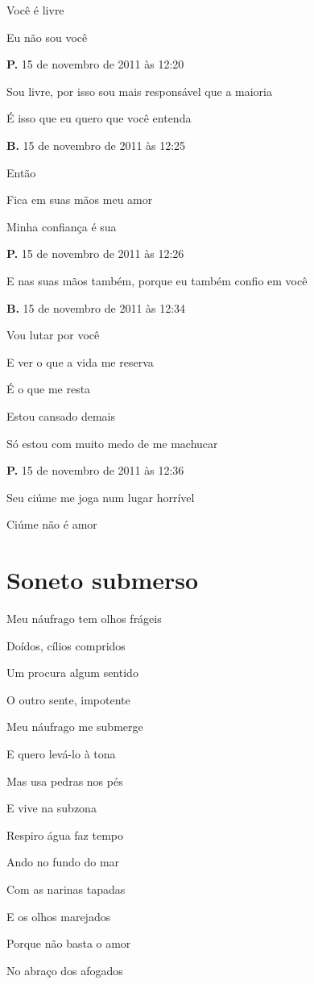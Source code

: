 {Você é livre

Eu não sou você

\textbf{P.} 15 de novembro de 2011 às 12:20

Sou livre, por isso sou mais responsável que a maioria

É isso que eu quero que você entenda

\textbf{B.} 15 de novembro de 2011 às 12:25

Então

Fica em suas mãos meu amor

Minha confiança é sua

\textbf{P.} 15 de novembro de 2011 às 12:26

E nas suas mãos também, porque eu também confio em você

\textbf{B.} 15 de novembro de 2011 às 12:34

Vou lutar por você

E ver o que a vida me reserva

É o que me resta

Estou cansado demais

Só estou com muito medo de me machucar

\textbf{P.} 15 de novembro de 2011 às 12:36

Seu ciúme me joga num lugar horrível

Ciúme não é amor
}

\chapter{Soneto submerso}

{\parindent0pt
Meu náufrago tem olhos frágeis

Doídos, cílios compridos

Um procura algum sentido

O outro sente, impotente\medskip

Meu náufrago me submerge

E quero levá-lo à tona

Mas usa pedras nos pés

E vive na subzona\medskip

Respiro água faz tempo

Ando no fundo do mar

Com as narinas tapadas\medskip

E os olhos marejados

Porque não basta o amor

No abraço dos afogados
}

